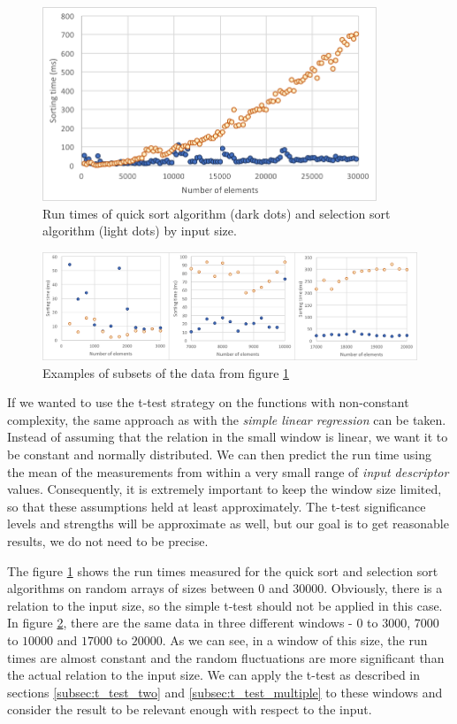 \begin{figure}[h!]
	\captionsetup{justification=centering,margin=0.5cm}
	\centerline{\mbox{\includegraphics[width=100mm]{./img/quick_vs_selection.png}}}
	\caption{Run times of quick sort algorithm (dark dots) and selection sort algorithm (light dots) by input size.}
	\label{fig:quick_vs_selection}
\end{figure}

\begin{figure}[h!]
	\captionsetup{justification=centering,margin=0.5cm}
	\centerline{\mbox{\includegraphics[width=150mm]{./img/window_t_test_examples.png}}}
	\caption{Examples of subsets of the data from figure \ref{fig:quick_vs_selection}}
	\label{fig:window_t_test_examples}
\end{figure}

If we wanted to use the t-test strategy on the functions with non-constant complexity, the same approach as with the \textit{simple linear regression} can be taken. Instead of assuming that the relation in the small window is linear, we want it to be constant and normally distributed. We can then predict the run time using the mean of the measurements from within a very small range of \textit{input descriptor} values. Consequently, it is extremely important to keep the window size limited, so that these assumptions held at least approximately. The t-test significance levels and strengths will be approximate as well, but our goal is to get reasonable results, we do not need to be precise.

The figure \ref{fig:quick_vs_selection} shows the run times measured for the quick sort and selection sort algorithms on random arrays of sizes between $0$ and $30000$. Obviously, there is a relation to the input size, so the simple t-test should not be applied in this case. In figure \ref{fig:window_t_test_examples}, there are the same data in three different windows - $0$ to $3000$, $7000$ to $10000$ and $17000$ to $20000$. As we can see, in a window of this size, the run times are almost constant and the random fluctuations are more significant than the actual relation to the input size. We can apply the t-test as described in sections \ref{subsec:t_test_two} and \ref{subsec:t_test_multiple} to these windows and consider the result to be relevant enough with respect to the input.


